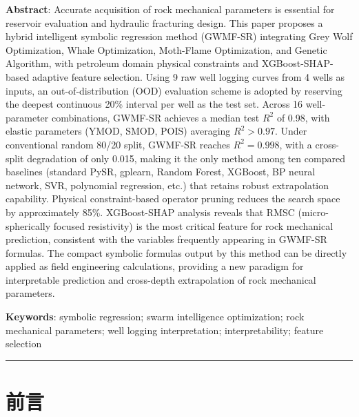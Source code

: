 \documentclass[a4paper,12pt]{ctexart}
\begin{document}
\vspace{0.5em}
\noindent\textbf{Abstract}: Accurate acquisition of rock mechanical parameters is essential for reservoir evaluation and hydraulic fracturing design. This paper proposes a hybrid intelligent symbolic regression method (GWMF-SR) integrating Grey Wolf Optimization, Whale Optimization, Moth-Flame Optimization, and Genetic Algorithm, with petroleum domain physical constraints and XGBoost-SHAP-based adaptive feature selection. Using 9 raw well logging curves from 4 wells as inputs, an out-of-distribution (OOD) evaluation scheme is adopted by reserving the deepest continuous 20\% interval per well as the test set. Across 16 well-parameter combinations, GWMF-SR achieves a median test $R^2$ of 0.98, with elastic parameters (YMOD, SMOD, POIS) averaging $R^2 > 0.97$. Under conventional random 80/20 split, GWMF-SR reaches $R^2 = 0.998$, with a cross-split degradation of only 0.015, making it the only method among ten compared baselines (standard PySR, gplearn, Random Forest, XGBoost, BP neural network, SVR, polynomial regression, etc.) that retains robust extrapolation capability. Physical constraint-based operator pruning reduces the search space by approximately 85\%. XGBoost-SHAP analysis reveals that RMSC (micro-spherically focused resistivity) is the most critical feature for rock mechanical prediction, consistent with the variables frequently appearing in GWMF-SR formulas. The compact symbolic formulas output by this method can be directly applied as field engineering calculations, providing a new paradigm for interpretable prediction and cross-depth extrapolation of rock mechanical parameters.

\noindent\textbf{Keywords}: symbolic regression; swarm intelligence optimization; rock mechanical parameters; well logging interpretation; interpretability; feature selection

\vspace{1em}
\noindent\rule{\textwidth}{0.4pt}


\section{前言}
\end{document}
